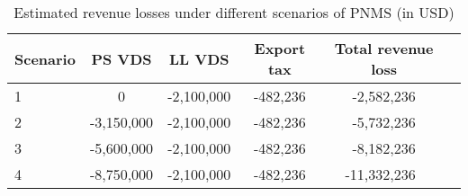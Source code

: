 \begin{table}[htbp] \centering 
	\caption{Estimated revenue losses under different scenarios of PNMS (in USD)} 
	\label{tab:revenue_loss} 

\begin{tabular}{l*{5}c}

\hline
\hline
Scenario	&	PS VDS	&	LL VDS	&	Export tax	&	Total revenue loss	\\
\hline
	1	&	0	&	-2,100,000	&	-482,236	&	-2,582,236	\\
	2	&	-3,150,000	&	-2,100,000	&	-482,236	&	-5,732,236	\\
	3	&	-5,600,000	&	-2,100,000	&	-482,236	&	-8,182,236	\\
	4	&	-8,750,000	&	-2,100,000	&	-482,236	&	-11,332,236 	\\
	
	\hline 
	\hline
	
\end{tabular} 




\end{table}